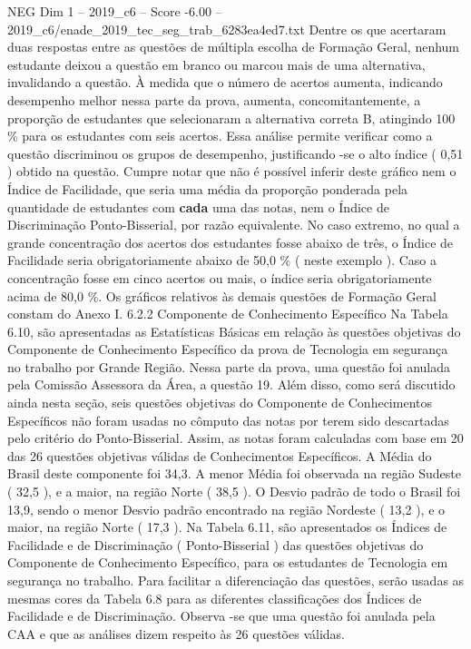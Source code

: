 \begin{textsample}{NEG Dim 1 – 2019\_c6 – Score -6.00 – 2019\_c6/enade\_2019\_tec\_seg\_trab\_6283ea4ed7.txt}
Dentre os que acertaram duas respostas entre as questões de múltipla escolha de Formação Geral, nenhum estudante deixou a questão em branco ou marcou mais de uma alternativa, invalidando a questão.
À medida que o número de acertos aumenta, indicando desempenho melhor nessa parte da prova, aumenta, concomitantemente, a proporção de estudantes que selecionaram a alternativa correta B, atingindo 100 \% para os estudantes com seis acertos.
Essa análise permite verificar como a questão discriminou os grupos de desempenho, justificando -se o alto índice ( 0,51 ) obtido na questão.
Cumpre notar que não é possível inferir deste gráfico nem o Índice de Facilidade, que seria uma média da proporção ponderada pela quantidade de estudantes com \textbf{cada} uma das notas, nem o Índice de Discriminação Ponto-Bisserial, por razão equivalente.
No caso extremo, no qual a grande concentração dos acertos dos estudantes fosse abaixo de três, o Índice de Facilidade seria obrigatoriamente abaixo de 50,0 \% ( neste exemplo ).
Caso a concentração fosse em cinco acertos ou mais, o índice seria obrigatoriamente acima de 80,0 \%.
Os gráficos relativos às demais questões de Formação Geral constam do Anexo I. 6.2.2 Componente de Conhecimento Específico Na Tabela 6.10, são apresentadas as Estatísticas Básicas em relação às questões objetivas do Componente de Conhecimento Específico da prova de Tecnologia em segurança no trabalho por Grande Região.
Nessa parte da prova, uma questão foi anulada pela Comissão Assessora da Área, a questão 19.
Além disso, como será discutido ainda nesta seção, seis questões objetivas do Componente de Conhecimentos Específicos não foram usadas no cômputo das notas por terem sido descartadas pelo critério do Ponto-Bisserial.
Assim, as notas foram calculadas com base em 20 das 26 questões objetivas válidas de Conhecimentos Específicos.
A Média do Brasil deste componente foi 34,3.
A menor Média foi observada na região Sudeste ( 32,5 ), e a maior, na região Norte ( 38,5 ).
O Desvio padrão de todo o Brasil foi 13,9, sendo o menor Desvio padrão encontrado na região Nordeste ( 13,2 ), e o maior, na região Norte ( 17,3 ).
Na Tabela 6.11, são apresentados os Índices de Facilidade e de Discriminação ( Ponto-Bisserial ) das questões objetivas do Componente de Conhecimento Específico, para os estudantes de Tecnologia em segurança no trabalho.
Para facilitar a diferenciação das questões, serão usadas as mesmas cores da Tabela 6.8 para as diferentes classificações dos Índices de Facilidade e de Discriminação.
Observa -se que uma questão foi anulada pela CAA e que as análises dizem respeito às 26 questões válidas.

\end{textsample}
